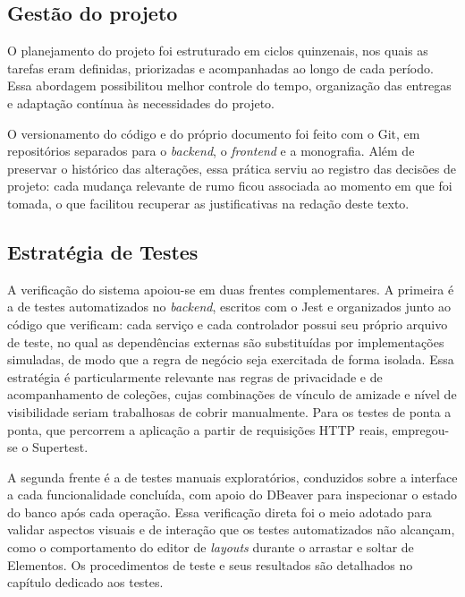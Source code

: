 \subsection{Gestão do projeto}

O planejamento do projeto foi estruturado em ciclos quinzenais, nos quais as tarefas eram definidas, priorizadas e acompanhadas ao longo de cada período. Essa abordagem possibilitou melhor controle do tempo, organização das entregas e adaptação contínua às necessidades do projeto.

O versionamento do código e do próprio documento foi feito com o Git, em repositórios separados para o \textit{backend}, o \textit{frontend} e a monografia. Além de preservar o histórico das alterações, essa prática serviu ao registro das decisões de projeto: cada mudança relevante de rumo ficou associada ao momento em que foi tomada, o que facilitou recuperar as justificativas na redação deste texto.

\subsection{Estratégia de Testes}

A verificação do sistema apoiou-se em duas frentes complementares. A primeira é a de testes automatizados no \textit{backend}, escritos com o Jest e organizados junto ao código que verificam: cada serviço e cada controlador possui seu próprio arquivo de teste, no qual as dependências externas são substituídas por implementações simuladas, de modo que a regra de negócio seja exercitada de forma isolada. Essa estratégia é particularmente relevante nas regras de privacidade e de acompanhamento de coleções, cujas combinações de vínculo de amizade e nível de visibilidade seriam trabalhosas de cobrir manualmente. Para os testes de ponta a ponta, que percorrem a aplicação a partir de requisições HTTP reais, empregou-se o Supertest.

A segunda frente é a de testes manuais exploratórios, conduzidos sobre a interface a cada funcionalidade concluída, com apoio do DBeaver para inspecionar o estado do banco após cada operação. Essa verificação direta foi o meio adotado para validar aspectos visuais e de interação que os testes automatizados não alcançam, como o comportamento do editor de \textit{layouts} durante o arrastar e soltar de Elementos. Os procedimentos de teste e seus resultados são detalhados no capítulo dedicado aos testes.


